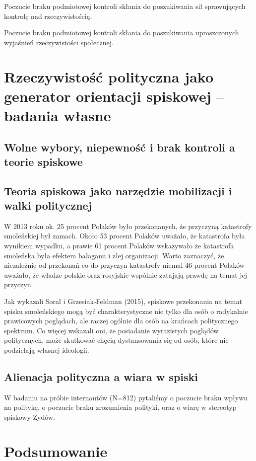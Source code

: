 \documentclass[man]{apa6}
\begin{document}
    Poczucie braku podmiotowej kontroli skłania do poszukiwania sił sprawujących kontrolę nad rzeczywistością.

    Poczucie braku podmiotowej kontroli skłania do poszukiwania uproszczonych wyjaśnień rzeczywistości społecznej.

    \section{Rzeczywistość polityczna jako generator orientacji spiskowej -- badania własne}




    \subsection{Wolne wybory, niepewność i brak kontroli a teorie spiskowe}



    \subsection{Teoria spiskowa jako narzędzie mobilizacji i walki politycznej}



    W 2013 roku ok. 25 procent Polaków było przekonanych, że przyczyną katastrofy smoleńskiej był zamach. Około 53 procent Polaków uważało, że katastrofa była wynikiem wypadku, a prawie 61 procent Polaków wskazywało że katastrofa smoleńska była efektem bałaganu i złej organizacji. Warto zaznaczyć, że niezależnie od przekonań co do przyczyn katastrofy niemal 46 procent Polaków uważało, że władze polskie oraz rosyjskie wspólnie zatajają prawdę na temat jej przyczyn.

    Jak wykazali Soral i Grzesiak-Feldman (2015), spiskowe przekonania na temat spisku smoleńskiego mogą być charakterystyczne nie tylko dla osób o radykalnie prawicowych poglądach, ale raczej ogólnie dla osób na krańcach politycznego spektrum. Co więcej wskazali oni, że posiadanie wyrazistych poglądów politycznych, może skutkować chęcią dystansowania się od osób, które nie podzielają własnej ideologii.

    \subsection{Alienacja polityczna a wiara w spiski}

    W badaniu na próbie internautów (N=812) pytaliśmy o poczucie braku wpływu na politykę, o poczucie braku zrozumienia polityki, oraz o wiarę w stereotyp spiskowy Żydów.


    \section{Podsumowanie}


\printbibliography
\end{document}
